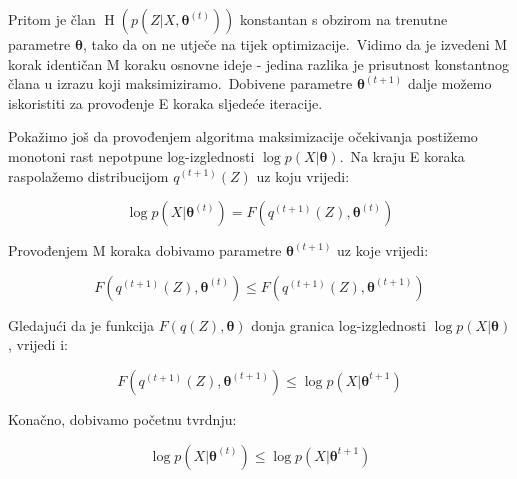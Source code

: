 \documentclass[diplomskirad]{fer}
\begin{document}
Pritom je član $\operatorname{H}(p(Z | X, \bm{\theta}^{(t)}))$ konstantan s obzirom na trenutne parametre $\bm{\theta}$, tako da on ne utječe na tijek optimizacije.\
Vidimo da je izvedeni M korak identičan M koraku osnovne ideje - jedina razlika je prisutnost konstantnog člana u izrazu koji maksimiziramo.\ 
Dobivene parametre $\bm{\theta}^{(t + 1)}$ dalje možemo iskoristiti za provođenje E koraka sljedeće iteracije.\ 


Pokažimo još da provođenjem algoritma maksimizacije očekivanja postižemo monotoni rast nepotpune log-izglednosti $\log p(X | \bm{\theta})$.\ 
Na kraju E koraka raspolažemo distribucijom $q^{(t + 1)}(Z)$ uz koju vrijedi:

\begin{equation}
  \log p(X | \bm{\theta}^{(t)}) = F(q^{(t + 1)}(Z), \bm{\theta}^{(t)})
  \label{eq:em_proof_pt1}
\end{equation}

Provođenjem M koraka dobivamo parametre $\bm{\theta}^{(t + 1)}$ uz koje vrijedi:

\begin{equation}
  F(q^{(t + 1)}(Z), \bm{\theta}^{(t)}) \leq F(q^{(t + 1)}(Z), \bm{\theta}^{(t + 1)})
  \label{eq:em_proof_pt2}
\end{equation}

Gledajući da je funkcija $F(q(Z), \bm{\theta})$ donja granica log-izglednosti $\log p(X | \bm{\theta})$, vrijedi i:

\begin{equation}
  F(q^{(t + 1)}(Z), \bm{\theta}^{(t + 1)}) \leq \log p(X | \bm{\theta}^{t + 1})
  \label{eq:em_proof_pt3}
\end{equation}

Konačno, dobivamo početnu tvrdnju:

\begin{equation}
  \log p(X | \bm{\theta}^{(t)}) \leq \log p(X | \bm{\theta}^{t + 1})
  \label{eq:em_proof_final}
\end{equation}

\end{document}
